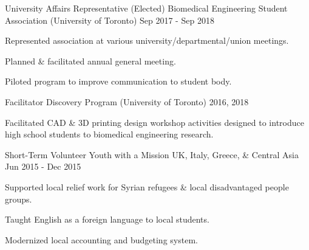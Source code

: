 

\begin{cventries}

  \cventry
	{University Affairs Representative (Elected)} %
	{Biomedical Engineering Student Association (University of Toronto)} %
	{\toronto} %
	{Sep 2017 - Sep 2018} %
	{
		\begin{cvitems} %
			\item {Represented association at various university/departmental/union meetings.}
			\item {Planned \& facilitated annual general meeting.}
			\item {Piloted program to improve communication to student body.}
		\end{cvitems}
}

  \cventry
	{Facilitator} %
	{Discovery Program (University of Toronto)} %
	{\toronto} %
	{2016, 2018} %
	{
		\begin{cvitems} %
			\item {Facilitated CAD \& 3D printing design workshop activities designed to introduce high school students to biomedical engineering research.}
		\end{cvitems}
	}

  \cventry
	{Short-Term Volunteer} %
	{Youth with a Mission} %
	{UK, Italy, Greece, \& Central Asia} %
	{Jun 2015 - Dec 2015} %
	{
		\begin{cvitems} %
			\item {Supported local relief work for Syrian refugees \& local disadvantaged people groups.}
			\item {Taught English as a foreign language to local students.}
			\item {Modernized local accounting and budgeting system.}
		\end{cvitems}
	}


\end{cventries}
